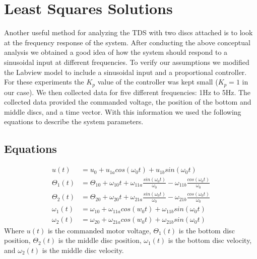 \documentclass[11pt,titlepage]{article}
\begin{document}
\section{Least Squares Solutions}
	Another useful method for analyzing the TDS with two discs attached is to look at the frequency response of the system. After conducting the above conceptual analysis we obtained a good idea of how the system should respond to a sinusoidal input at different frequencies. To verify our assumptions we modified the Labview model to include a sinusoidal input and a proportional controller. For these experiments the $K_p$ value of the controller was kept small ($K_p = 1$ in our case). We then collected data for five different frequencies: 1Hz to 5Hz. The collected data provided the commanded voltage, the position of the bottom and middle discs, and a time vector. With this information we used the following equations to describe the system parameters.
	\subsection{Equations} \label{sec:eq}
		\begin{align}
			u(t) &= u_0 + u_{1a}cos(\omega_0t) + u_{1b}sin(\omega_0t) \\[1em]
			\Theta_1(t) &= \Theta_{10} + \omega_{10}t + \omega_{11a}\frac{sin(\omega_0t)}{\omega_0} - \omega_{11b}\frac{cos(\omega_0t)}{\omega_0} \\[1em]
			\Theta_2(t) &= \Theta_{20} + \omega_{20}t + \omega_{21a}\frac{sin(\omega_0t)}{\omega_0} - \omega_{21b}\frac{cos(\omega_0t)}{\omega_0} \\[1em]
			\omega_1(t) &= \omega_{10} + \omega_{11a}cos(w_0t) + \omega_{11b}sin(\omega_0t) \\[1em]
			\omega_2(t) &= \omega_{20} + \omega_{21a}cos(w_0t) + \omega_{21b}sin(\omega_0t)
		\end{align}
		Where $u(t)$ is the commanded motor voltage, $\Theta_1(t)$ is the bottom disc position, $\Theta_2(t)$ is the middle disc position, $\omega_1(t)$ is the bottom disc velocity, and $\omega_2(t)$ is the middle disc velocity.
\end{document}
